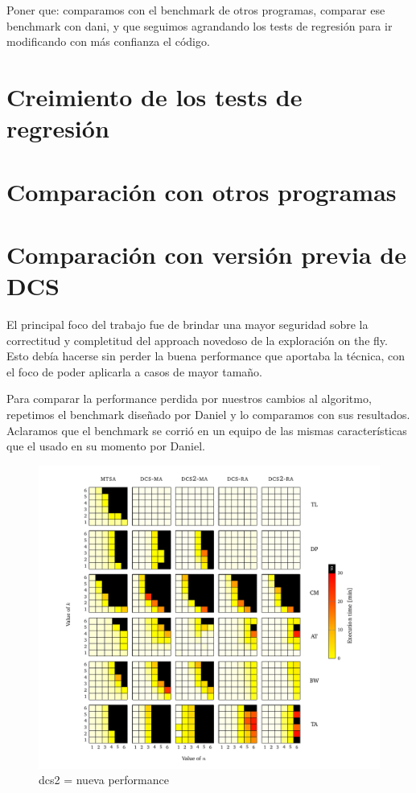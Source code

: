 Poner que: comparamos con el benchmark de otros programas, comparar ese benchmark con dani, y que seguimos agrandando los tests de regresión para ir modificando con más confianza el código.

\section{Creimiento de los tests de regresión}


\section{Comparación con otros programas}


\section{Comparación con versión previa de DCS}
El principal foco del trabajo fue de brindar una mayor seguridad sobre la correctitud y completitud del approach novedoso de la exploración on the fly. Esto debía hacerse sin perder la buena performance que aportaba la técnica, con el foco de poder aplicarla a casos de mayor tamaño.

Para comparar la performance perdida por nuestros cambios al algoritmo, repetimos el benchmark diseñado por Daniel y lo comparamos con sus resultados. Aclaramos que el benchmark se corrió en un equipo de las mismas características que el usado en su momento por Daniel.

\begin{figure}[htb]
    \centering
    \includegraphics[width=\linewidth]{figures/dcs_vs.pdf}  
    \caption{dcs2 = nueva performance}
    \label{fig:dcs_vs}
\end{figure}


